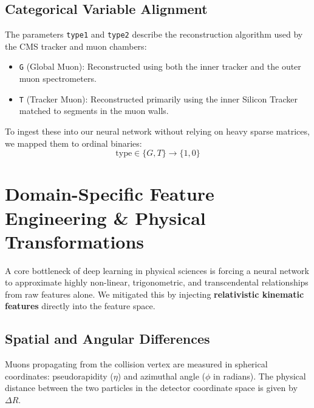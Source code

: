 \documentclass[11pt,a4paper]{article}
\begin{document}
\subsection{Categorical Variable Alignment}

The parameters \texttt{type1} and \texttt{type2} describe the reconstruction algorithm used by the CMS tracker and muon chambers:
\begin{itemize}
    \item \texttt{G} (Global Muon): Reconstructed using both the inner tracker and the outer muon spectrometers.
    \item \texttt{T} (Tracker Muon): Reconstructed primarily using the inner Silicon Tracker matched to segments in the muon walls.
\end{itemize}

To ingest these into our neural network without relying on heavy sparse matrices, we mapped them to ordinal binaries:
\begin{equation}
\text{type} \in \{G, T\} \longrightarrow \{1, 0\}
\end{equation}

\section{Domain-Specific Feature Engineering \& Physical Transformations}

A core bottleneck of deep learning in physical sciences is forcing a neural network to approximate highly non-linear, trigonometric, and transcendental relationships from raw features alone. We mitigated this by injecting \textbf{relativistic kinematic features} directly into the feature space.

\subsection{Spatial and Angular Differences}

Muons propagating from the collision vertex are measured in spherical coordinates: pseudorapidity ($\eta$) and azimuthal angle ($\phi$ in radians). The physical distance between the two particles in the detector coordinate space is given by $\Delta R$.
\end{document}
